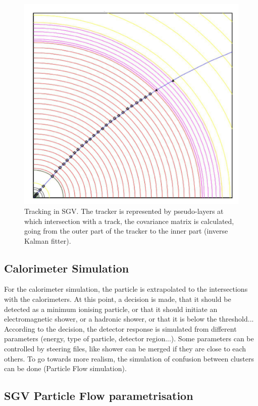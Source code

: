 \begin{figure}[t]
  \centering
  \includegraphics[scale=0.3]{chap6/fig_SGV/Tracking_SGV.png}
  \caption{Tracking in SGV. The tracker is represented by pseudo-layers at which intersection with a track, the covariance matrix is calculated, going from the outer part of the tracker to the inner part (inverse Kalman fitter).}
  \label{fig:tracking_sgv}
\end{figure}

\subsection{Calorimeter Simulation}

For the calorimeter simulation, the particle is extrapolated to the intersections with the calorimeters. At this point, a decision is made, that it should be detected as a minimum ionising particle, or that it should initiate an electromagnetic shower, or a hadronic shower, or that it is below the threshold... According to the decision, the detector response is simulated from different parameters (energy, type of particle, detector region...). Some parameters can be controlled by steering files, like shower can be merged if they are close to each others. To go towards more realism, the simulation of confusion between clusters can be done (Particle Flow simulation).

\subsection{SGV Particle Flow parametrisation}
\label{sec:sgv_pflow}

